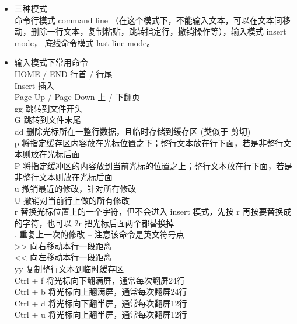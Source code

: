 \documentclass{ctexart}
\begin{document}
\begin{itemize}
    \item 三种模式
    \\ 命令行模式 command line （在这个模式下，不能输入文本，可以在文本间移动，删除一行文本，复制粘贴，跳转指定行，撤销操作等），输入模式 insert mode， 底线命令模式 last line mode。
    \item 输入模式下常用命令
    \\ HOME / END \qquad 行首 / 行尾
    \\ Insert \qquad 插入
    \\ Page Up / Page Down \qquad 上 / 下翻页
    \\ gg  \qquad 跳转到文件开头
    \\ G  \qquad 跳转到文件末尾
    \\ dd  \qquad 删除光标所在一整行数据，且临时存储到缓存区 (类似于 剪切)
    \\ p  \qquad 将指定缓存区内容放在光标位置之下；整行文本放在行下面，若是非整行文本则放在光标后面
    \\ P  \qquad 将指定缓冲区的内容放到当前光标的位置之上；整行文本放在行下面，若是非整行文本则放在光标后面
    \\ u  \qquad 撤销最近的修改，针对所有修改
    \\ U  \qquad 撤销对当前行上做的所有修改
    \\ r  \qquad	替换光标位置上的一个字符，但不会进入 insert 模式，先按 r 再按要替换成的字符，也可以 2r 把光标后面两个都替换掉
    \\ .   \qquad 重复上一次的修改 -- 注意该命令是英文符号点
    \\ >>  \qquad 向右移动本行一段距离
    \\ <<  \qquad 向左移动本行一段距离
    \\ yy  \qquad 复制整行文本到临时缓存区 
    \\ Ctrl + f  \qquad 将光标向下翻满屏，通常每次翻屏24行
    \\ Ctrl + b  \qquad 将光标向上翻满屏，通常每次翻屏24行
    \\ Ctrl + d   \qquad  将光标向下翻半屏，通常每次翻屏12行
    \\ Ctrl + u   \qquad  将光标向上翻半屏，通常每次翻屏12行


\end{itemize}
\end{document}
